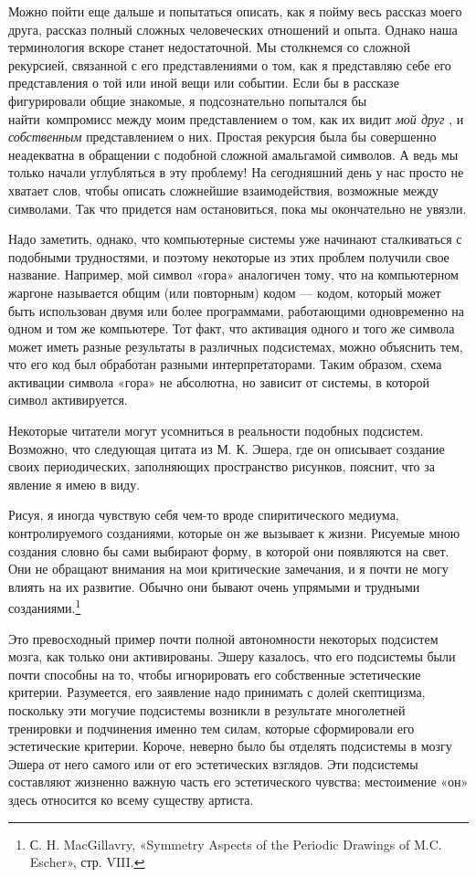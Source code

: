\documentclass[../main.tex]{subfiles}
\begin{document}
Можно пойти еще дальше и попытаться описать, как я пойму весь рассказ моего друга, рассказ полный сложных человеческих отношений и опыта. Однако наша терминология вскоре станет недостаточной. Мы столкнемся со сложной рекурсией, связанной с его представлениями о том, как я представляю себе его представления о той или иной вещи или событии. Если бы в рассказе фигурировали общие знакомые, я подсознательно попытался бы найти~компромисс между моим представлением о том, как их видит \emph{мой друг} , и \emph{собственным} представлением о них. Простая рекурсия была бы совершенно неадекватна в обращении с подобной сложной амальгамой символов. А ведь мы только начали углубляться в эту проблему! На сегодняшний день у нас просто не хватает слов, чтобы описать сложнейшие взаимодействия, возможные между символами. Так что придется нам остановиться, пока мы окончательно не увязли.

Надо заметить, однако, что компьютерные системы уже начинают сталкиваться с подобными трудностями, и поэтому некоторые из этих проблем получили свое название. Например, мой символ «гора» аналогичен тому, что на компьютерном жаргоне называется общим (или повторным) кодом --- кодом, который может быть использован двумя или более программами, работающими одновременно на одном и том же компьютере. Тот факт, что активация одного и того же символа может иметь разные результаты в различных подсистемах, можно объяснить тем, что его код был обработан разными интерпретаторами. Таким образом, схема активации символа «гора» не абсолютна, но зависит от системы, в которой символ активируется.

Некоторые читатели могут усомниться в реальности подобных подсистем. Возможно, что следующая цитата из М. К. Эшера, где он описывает создание своих периодических, заполняющих пространство рисунков, пояснит, что за явление я имею в виду.

Рисуя, я иногда чувствую себя чем-то вроде спиритического медиума, контролируемого созданиями, которые он же вызывает к жизни. Рисуемые мною создания словно бы сами выбирают форму, в которой они появляются на свет. Они не обращают внимания на мои критические замечания, и я почти не могу влиять на их развитие. Обычно они бывают очень упрямыми и трудными созданиями.\footnote{С. H. MacGillavry, «Symmetry Aspects of the Periodic Drawings of M.C. Escher», стр. VIII.}

Это превосходный пример почти полной автономности некоторых подсистем мозга, как только они активированы. Эшеру казалось, что его подсистемы были почти способны на то, чтобы игнорировать его собственные эстетические критерии. Разумеется, его заявление надо принимать с долей скептицизма, поскольку эти могучие подсистемы возникли в результате многолетней тренировки и подчинения именно тем силам, которые сформировали его эстетические критерии. Короче, неверно было бы отделять подсистемы в мозгу Эшера от него самого или от его эстетических взглядов. Эти подсистемы составляют жизненно важную часть его эстетического чувства; местоимение «он» здесь относится ко всему существу артиста.
\end{document}
